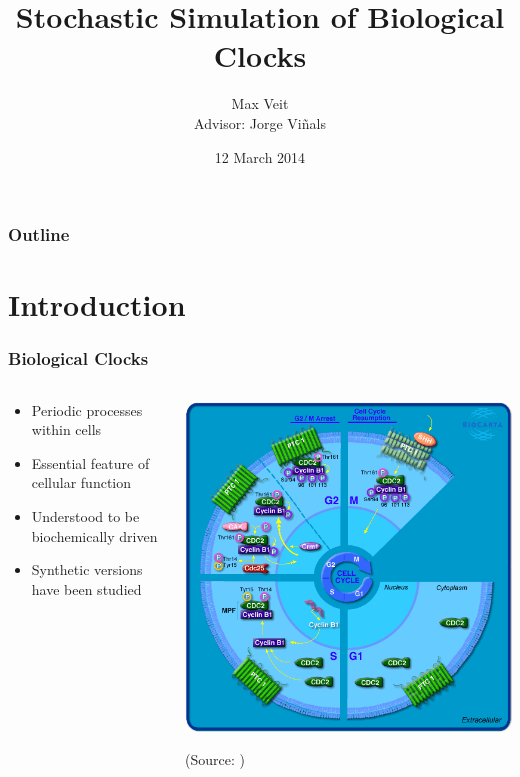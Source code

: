 \documentclass[xcolor={usenames,dvipsnames,svgnames}]{beamer}
\begin{document}
\title[Biochemical Networks]{Stochastic Simulation of Biological Clocks}
\author[Max Veit]{Max Veit\\Advisor: Jorge Viñals}
\date[2014-03-12]{12 March 2014}
\subject{Physics}

\frame{\titlepage}

\begin{frame} \frametitle{Outline}
	\tableofcontents
\end{frame}

\section{Introduction} %
\label{sec:introduction}
\begin{frame}
    \frametitle{Biological Clocks}
    \begin{columns}[t]
        \begin{column}{0.5\textwidth}
            \begin{itemize}
                \item Periodic processes within cells
                \item Essential feature of cellular function
                \item Understood to be biochemically driven
                \item Synthetic versions have been studied
            \end{itemize}
        \end{column}
        \begin{column}[T]{0.5\textwidth}
            \includegraphics[width=\textwidth]{h_ptc1Pathway.png}

            \small (Source: \cite{biocarta})
        \end{column}
    \end{columns}
\end{frame}
\end{document}
